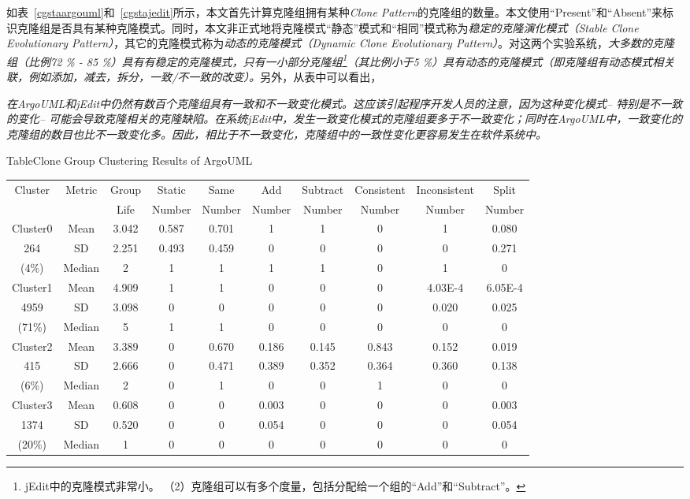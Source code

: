 如表~\ref{cgstaargouml}和~\ref{cgstajedit}所示，本文首先计算克隆组拥有某种{\em Clone Pattern}的克隆组的数量。本文使用“Present”和“Absent”来标识克隆组是否具有某种克隆模式。同时，本文非正式地将克隆模式“静态”模式和“相同”模式称为{\em 稳定的克隆演化模式（Stable Clone Evolutionary Pattern）}，其它的克隆模式称为{\em 动态的克隆模式（Dynamic Clone  Evolutionary Pattern）}。对这两个实验系统，{\em 大多数的克隆组（比例72 \% - 85 \%）具有有稳定的克隆模式，只有一小部分克隆组\footnote{ jEdit中的克隆模式非常小。 （2）克隆组可以有多个度量，包括分配给一个组的“Add”和“Subtract”。}（其比例小于5 \%）具有动态的克隆模式（即克隆组有动态模式相关联，例如添加，减去，拆分，一致/不一致的改变）。}另外，从表中可以看出，{\em 在ArgoUML和jEdit中仍然有数百个克隆组具有一致和不一致变化模式。这应该引起程序开发人员的注意，因为这种变化模式-- 特别是不一致的变化-- 可能会导致克隆相关的克隆缺陷。在系统{\em  jEdit}中，{\em 发生一致变化模式的克隆组要多于不一致变化；同时在ArgoUML中，一致变化的克隆组的数目也比不一致变化多}。因此，相比于不一致变化，{\em 克隆组中的一致性变化更容易发生在软件系统中}。

\begin{table}[htbp]
{Table$\!$}{Clone Group Clustering Results of ArgoUML}
\vspace{0.5em}
\centering
\footnotesize
\begin{tabular}{cccccccccc}
\toprule[1.5pt]
\multirow{2}{*}{Cluster}&\multirow{2}{*}{Metric}&Group&Static &Same &Add &Subtract &Consistent &	Inconsistent &Split \\ 
&&Life& Number& Number& Number& Number& Number&	 Number& Number\\ 
\midrule[1pt]
Cluster0&Mean&	3.042	&0.587	&0.701	&1	&1	&0	&1	&0.080\\ 
\cline{2-10}
264&SD&2.251	&0.493	&0.459	&0	&0	&0	&0	&0.271\\ 
\cline{2-10}
(4\%)&Median	&2	&1	&1	&1  &1	&0	&1	&0\\ \hline
Cluster1&Mean	&4.909&1	&1	&0	&0	&0	&4.03E-4	&6.05E-4\\ 
\cline{2-10}
4959&SD&3.098&0	&0	&0	&0	&0	&0.020&0.025\\ 
\cline{2-10}
(71\%)&Median	&5	&1	&1	&0	&0	&0	&0	&0\\ 
\hline
Cluster2&Mean	&3.389&0	&0.670&0.186&0.145&0.843	&0.152&0.019\\ 
\cline{2-10}
415&SD&2.666&0	&0.471&0.389&0.352&0.364	&0.360&0.138\\ 
\cline{2-10}
(6\%)&Median	&2	&0	&1	&0	&0	&1	&0	&0\\ 
\hline
Cluster3&Mean	&0.608&0	&0	&0.003&0	&0	&0	&0.003\\ 
\cline{2-10}
1374&SD&0.520&0	&0	&0.054&0	&0	&0	&0.054\\ 
\cline{2-10}
(20\%)&Median	&1	&0	&0	&0	&0	&0	&0	&0\\
\bottomrule[1.5pt]
\end{tabular}
\end{table}

}
